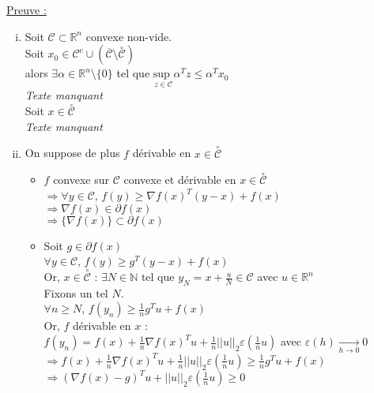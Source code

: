 \documentclass[12pt,a4paper]{article}
\begin{document}
\underline{Preuve :}
\begin{enumerate}[i)]
    \item Soit $\mathcal{C} \subset \mathbb{R}^n$ convexe non-vide.\\
    Soit $x_0 \in \mathcal{C}^c \cup (\overset{\_}{\mathcal{C}} \text{\textbackslash } \overset{\circ}{\mathcal{C}})$\\
    alors $\exists \alpha \in \mathbb{R}^n \text{\textbackslash} \{0\}$ tel que $\underset{z \in \mathcal{C}}{\text{sup }} \alpha^T z \leq \alpha^T x_0$\\

    \textit{Texte manquant}\\


    Soit $x \in \overset{\circ}{\mathcal{C}}$\\

    \textit{Texte manquant}\\


    \item On suppose de plus $f$ dérivable en $x \in \overset{\circ}{\mathcal{C}}$
    \begin{itemize}
        \item $f$ convexe sur $\mathcal{C}$ convexe et dérivable en $x \in \overset{\circ}{\mathcal{C}}$\\
        $\Rightarrow \forall y \in \mathcal{C}$, $f(y) \geq \nabla f(x)^T(y - x) + f(x)$\\
        $\Rightarrow \nabla f(x) \in \partial f(x)$\\
        $\Rightarrow \{\nabla f(x) \} \subset \partial f(x)$\\

        \item Soit $g \in \partial f(x)$\\
        $\forall y \in \mathcal{C}$, $f(y) \geq g^T(y - x) + f(x)$\\
        Or, $x \in \overset{\circ}{\mathcal{C}}$ : $\exists N \in \mathbb{N} \text{ tel que } y_N = x + \frac{u}{N} \in \mathcal{C}$ avec $u \in \mathbb{R}^n$\\

        Fixons un tel $N$.\\
        $\forall n \geq N$, $f(y_n) \geq \frac{1}{n} g^T u + f(x)$\\

        Or, $f$ dérivable en $x$ :\\
        $f(y_n) = f(x) + \frac{1}{n} \nabla f(x)^T u + \frac{1}{n} ||u||_2 \varepsilon(\frac{1}{n}u)$ avec $\varepsilon(h) \xrightarrow[h \rightarrow 0]{} 0$\\
        $\Rightarrow f(x) + \frac{1}{n} \nabla f(x)^T u + \frac{1}{n} ||u||_2 \varepsilon(\frac{1}{n}u) \geq \frac{1}{n} g^T u + f(x)$\\
        $\Rightarrow (\nabla f(x) - g)^T u + ||u||_2 \varepsilon(\frac{1}{n}u) \geq 0$\\
        

\end{itemize}
\end{enumerate}
\end{document}
